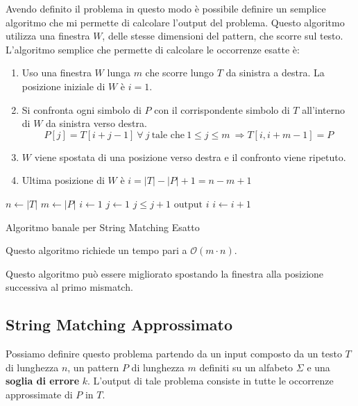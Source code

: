 Avendo definito il problema in questo modo è possibile definire un semplice algoritmo che mi permette di calcolare l'output del problema. Questo algoritmo utilizza una finestra $W$, delle stesse dimensioni del pattern, che scorre sul testo. L'algoritmo semplice che permette di calcolare le occorrenze esatte è:
\begin{enumerate}
    \item Uso una finestra $W$ lunga $m$ che scorre lungo $T$ da sinistra a destra. La posizione iniziale di $W$ è $i = 1$.
    \item Si confronta ogni simbolo di $P$ con il corrispondente simbolo di $T$ all'interno di $W$ da sinistra verso destra.
    \begin{equation}
        P[j] = T[i + j - 1] \ \forall \ j \ \text{tale che} \ 1 \leq j \leq m \ \Rightarrow T[i, i + m - 1] = P
    \end{equation}
    \item $W$ viene spostata di una posizione verso destra e il confronto viene ripetuto.
    \item Ultima posizione di $W$ è $i = |T| - |P| + 1 = n - m + 1$
\end{enumerate}
\begin{algorithm}
  \begin{algorithmic}
        \State $n\gets |T|$
        \State $m \gets |P|$
        \State $i\gets 1$
            \State $j \gets 1$
                \State $j \leq j + 1$
            \EndWhile
                \State $\text{output } i$
            \EndIf
            \State $i \gets i + 1$
        \EndWhile
    \EndFunction
  \end{algorithmic}
  \caption{Algoritmo banale per String Matching Esatto}
\end{algorithm}

Questo algoritmo richiede un tempo pari a $\mathcal{O}(m \cdot n)$.
\begin{nota}
    Questo algoritmo può essere migliorato spostando la finestra alla posizione successiva al primo mismatch.
\end{nota}
\subsection{String Matching Approssimato}
Possiamo definire questo problema partendo da un input composto da un testo $T$ di lunghezza $n$, un pattern $P$ di lunghezza $m$ definiti su un alfabeto $\Sigma$ e una \textbf{soglia di errore} $k$. L'output di tale problema consiste in tutte le occorrenze approssimate di $P$ in $T$.

